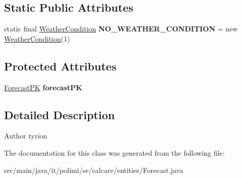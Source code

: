 \subsection*{Static Public Attributes}
\begin{DoxyCompactItemize}
\item 
\hypertarget{classit_1_1polimi_1_1se_1_1calcare_1_1entities_1_1Forecast_a000b56ea1b46fcd780c8410bc3fd2340}{}static final \hyperlink{classit_1_1polimi_1_1se_1_1calcare_1_1entities_1_1WeatherCondition}{Weather\+Condition} {\bfseries N\+O\+\_\+\+W\+E\+A\+T\+H\+E\+R\+\_\+\+C\+O\+N\+D\+I\+T\+I\+O\+N} = new \hyperlink{classit_1_1polimi_1_1se_1_1calcare_1_1entities_1_1WeatherCondition}{Weather\+Condition}(1)\label{classit_1_1polimi_1_1se_1_1calcare_1_1entities_1_1Forecast_a000b56ea1b46fcd780c8410bc3fd2340}

\end{DoxyCompactItemize}
\subsection*{Protected Attributes}
\begin{DoxyCompactItemize}
\item 
\hypertarget{classit_1_1polimi_1_1se_1_1calcare_1_1entities_1_1Forecast_ac5ae3b96d754a90aadd818afe9709898}{}\hyperlink{classit_1_1polimi_1_1se_1_1calcare_1_1entities_1_1ForecastPK}{Forecast\+P\+K} {\bfseries forecast\+P\+K}\label{classit_1_1polimi_1_1se_1_1calcare_1_1entities_1_1Forecast_ac5ae3b96d754a90aadd818afe9709898}

\end{DoxyCompactItemize}


\subsection{Detailed Description}
\begin{DoxyAuthor}{Author}
tyrion 
\end{DoxyAuthor}


The documentation for this class was generated from the following file\+:\begin{DoxyCompactItemize}
\item 
src/main/java/it/polimi/se/calcare/entities/Forecast.\+java\end{DoxyCompactItemize}
